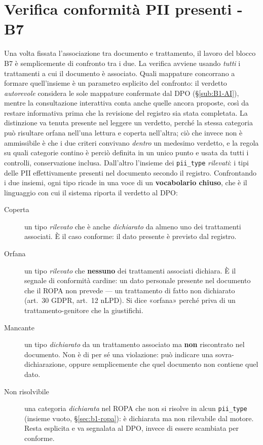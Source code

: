 \section{Verifica conformità PII presenti - B7}
\label{sec:b7-verifica-compliance-PII}
Una volta fissata l'associazione tra documento e trattamento, il lavoro del blocco B7 è semplicemente di confronto tra i due. La verifica avviene usando \emph{tutti} i trattamenti a cui il documento è associato. Quali mappature concorrano a formare quell'insieme è un parametro esplicito del confronto: il verdetto \emph{autorevole} considera le sole mappature confermate dal DPO (§\ref{sub:B1-AI}), mentre la consultazione interattiva conta anche quelle ancora proposte, così da restare informativa prima che la revisione del registro sia stata completata. La distinzione va tenuta presente nel leggere un verdetto, perché la stessa categoria può risultare orfana nell'una lettura e coperta nell'altra; ciò che invece non è ammissibile è che i due criteri convivano \emph{dentro} un medesimo verdetto, e la regola su quali categorie contino è perciò definita in un unico punto e usata da tutti i controlli, conservazione inclusa. Dall'altro l'insieme dei \texttt{pii\_type} \emph{rilevati}: i tipi delle PII effettivamente presenti nel documento secondo il registro. Confrontando i due insiemi, ogni tipo ricade in una voce di un \textbf{vocabolario chiuso}, che è il linguaggio con cui il sistema riporta il verdetto al DPO:

\begin{description}
	\item[Coperta] un tipo \emph{rilevato} che è anche \emph{dichiarato} da almeno uno dei trattamenti associati. È il caso conforme: il dato presente è previsto dal registro.
	\item[Orfana] un tipo \emph{rilevato} che \textbf{nessuno} dei trattamenti associati dichiara. È il segnale di conformità cardine: un dato personale presente nel documento che il ROPA non prevede --- un trattamento di fatto non dichiarato (art.~30 GDPR, art.~12 nLPD). Si dice «orfana» perché priva di un trattamento-genitore che la giustifichi.
	\item[Mancante] un tipo \emph{dichiarato} da un trattamento associato ma \textbf{non} riscontrato nel documento. Non è di per sé una violazione: può indicare una sovra-dichiarazione, oppure semplicemente che quel documento non contiene quel dato.
	\item[Non risolvibile] una categoria \emph{dichiarata} nel ROPA che non si risolve in alcun \texttt{pii\_type} (insieme vuoto, §\ref{sec:b1-ropa}): è dichiarata ma non rilevabile dal motore. Resta esplicita e va segnalata al DPO, invece di essere scambiata per conforme.
\end{description}

